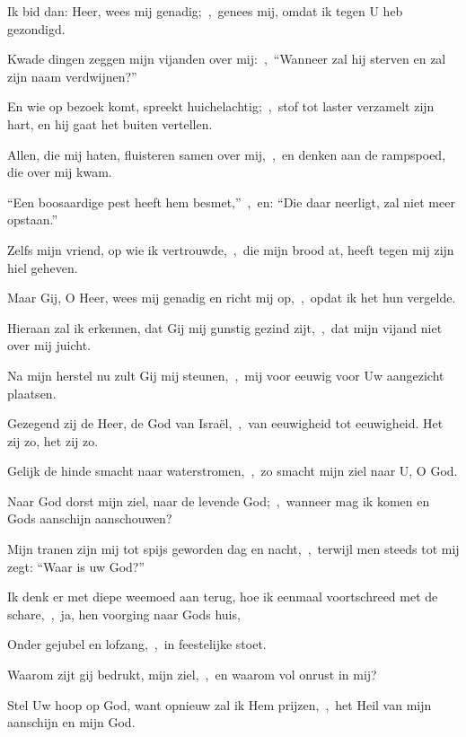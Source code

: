\documentclass[12pt,twoside,a5paper]{article}
\begin{document}

\begin{halfparskip}
  Ik bid dan: Heer, wees mij genadig;~\sep\ genees mij, omdat ik tegen U heb gezondigd.

  Kwade dingen zeggen mijn vijanden over mij:~\sep\ ``Wanneer zal hij sterven en zal zijn naam verdwijnen?''

  En wie op bezoek komt, spreekt huichelachtig;~\sep\ stof tot laster verzamelt zijn hart, en hij gaat het buiten vertellen.

  Allen, die mij haten, fluisteren samen over mij,~\sep\ en denken aan de rampspoed, die over mij kwam.

  ``Een boosaardige pest heeft hem besmet,''~\sep\ en: ``Die daar neerligt, zal niet meer opstaan.''

  Zelfs mijn vriend, op wie ik vertrouwde,~\sep\ die mijn brood at, heeft tegen mij zijn hiel geheven.
\end{halfparskip}


\begin{halfparskip}
  Maar Gij, O Heer, wees mij genadig en richt mij op,~\sep\ opdat ik het hun vergelde.

  Hieraan zal ik erkennen, dat Gij mij gunstig gezind zijt,~\sep\ dat mijn vijand niet over mij juicht.

  Na mijn herstel nu zult Gij mij steunen,~\sep\ mij voor eeuwig voor Uw aangezicht plaatsen.

  Gezegend zij de Heer, de God van Israël,~\sep\ van eeuwigheid tot eeuwigheid. Het zij zo, het zij zo.
\end{halfparskip}



\begin{halfparskip}
  Gelijk de hinde smacht naar waterstromen,~\sep\ zo smacht mijn ziel naar U, O God.


  Naar God dorst mijn ziel, naar de levende God;~\sep\ wanneer mag ik komen en Gods aanschijn aanschouwen?

  Mijn tranen zijn mij tot spijs geworden dag en nacht,~\sep\ terwijl men steeds tot mij zegt: ``Waar is uw God?''

  Ik denk er met diepe weemoed aan terug, hoe ik eenmaal voortschreed met de schare,~\sep\ ja, hen voorging naar Gods huis,

  Onder gejubel en lofzang,~\sep\ in feestelijke stoet.

  Waarom zijt gij bedrukt, mijn ziel,~\sep\ en waarom vol onrust in mij?

  Stel Uw hoop op God, want opnieuw zal ik Hem prijzen,~\sep\ het Heil van mijn aanschijn en mijn God.
\end{halfparskip}
\end{document}
